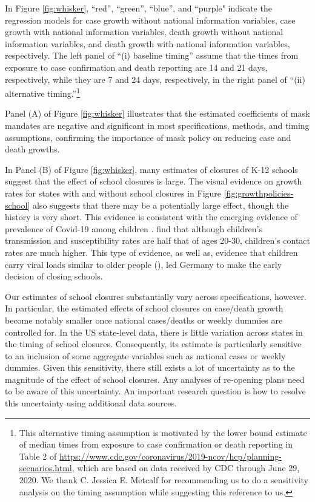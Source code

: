 \documentclass[11pt,reqno,letter]{amsart}
\theoremstyle{definition}
\begin{document}
In Figure \ref{fig:whisker}, ``red'', ``green'', ``blue'', and ``purple" indicate the regression models for case growth without national information variables, case growth with national information variables, death growth without national information variables, and death growth with national information variables, respectively. The left panel of ``(i) baseline timing'' assume that the times from exposure to case confirmation and death reporting are 14 and 21 days, respectively,  while they are 7 and 24 days, respectively, in the right panel of ``(ii) alternative timing.''\footnote{This alternative timing assumption is motivated by the lower bound estimate of median times from exposure to case confirmation or death reporting in Table 2 of \url{https://www.cdc.gov/coronavirus/2019-ncov/hcp/planning-scenarios.html}, which are based on data received by CDC through June 29, 2020.  We thank C. Jessica E. Metcalf for recommending us to do a sensitivity analysis on the timing assumption while suggesting this reference to us.}

Panel (A) of Figure  \ref{fig:whisker} illustrates that the estimated coefficients of mask mandates are negative and significant in most specifications, methods, and timing assumptions, confirming the importance of mask policy on reducing case and death growths.  %

In Panel (B) of  Figure  \ref{fig:whisker}, many estimates of closures of K-12 schools  suggest that  the effect of school closures is large. The visual evidence on growth rates for states with and without school closures in Figure \ref{fig:growthpolicies-school} also suggests that there may be a potentially large effect, though the history is very short.  This evidence is consistent
with the emerging evidence of prevalence of Covid-19 among children  \citep{Lee2020jama,Szablewski2020cdc}. \cite{children:nature} find that although children's
transmission and susceptibility rates are half that of ages 20-30,
children's contact rates are much higher.
This type of evidence, as well as, evidence that children carry viral
loads similar to older people (\cite{children:germany}), led Germany to make the early decision of closing schools.

Our estimates of school closures substantially vary  across  specifications, however. In particular, the estimated effects of school closures on case/death growth become notably smaller once national cases/deaths or weekly dummies are controlled for.
In the US state-level data,  there is little variation across states in the timing of school closures.
Consequently, its estimate is particularly sensitive to an inclusion of some aggregate variables such as national cases or weekly dummies.  Given this sensitivity,  there still exists a lot of uncertainty as to the magnitude of the effect of school closures. Any analyses of re-opening plans need to be aware of this uncertainty.  An important research question is how to resolve this uncertainty using additional data sources.
\end{document}
